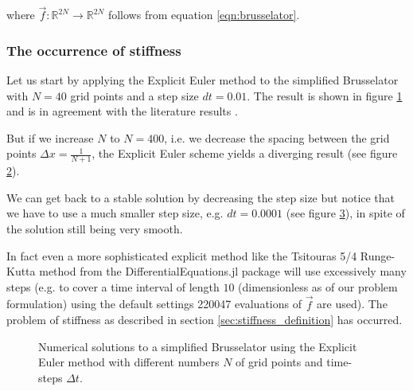 where $\vec{f}: \mathbb{R}^{2N} \rightarrow \mathbb{R}^{2N}$ follows from equation \ref*{eqn:brusselator}.

\subsubsection*{The occurrence of stiffness}
Let us start by applying the Explicit Euler method to the simplified Brusselator with $N = 40$ grid points and a step size $dt = 0.01$. The result is shown in figure \ref{fig:bruss_ex_eu40} and is in agreement with the literature results \citep[chapter IV.1]{Hairer1996}.

But if we increase $N$ to $N = 400$, i.e. we decrease the spacing between the grid points $\Delta x = \frac{1}{N+1}$, the Explicit Euler scheme yields a diverging result (see figure \ref{fig:bruss_ex_eu400A}).

We can get back to a stable solution by decreasing the step size but notice that we have to use a much smaller step size, e.g. $dt = 0.0001$ (see figure \ref{fig:bruss_ex_eu400B}), in spite of the solution still being very smooth.

In fact even a more sophisticated explicit method like the Tsitouras 5/4 Runge-Kutta method from the DifferentialEquations.jl package \citep{rackauckas17} will use excessively many steps (e.g. to cover a time interval of length $10$ (dimensionless as of our problem formulation) using the default settings 220047 evaluations of $\vec{f}$ are used). The problem of stiffness as described in section \ref*{sec:stiffness_definition} has occurred.

\begin{figure}
  \centering
  \begin{subfigure}{.5\textwidth}
    \centering
    
    \caption[width=.92\linewidth]{}
    \label{fig:bruss_ex_eu40}
  \end{subfigure}%
  \begin{subfigure}{.5\textwidth}
    \centering
    
    \caption[width=.92\linewidth]{}
    \label{fig:bruss_ex_eu400A}
  \end{subfigure}
  \begin{subfigure}{.5\textwidth}
    \centering
    
    \caption[width=.92\linewidth]{}
    \label{fig:bruss_ex_eu400B}
  \end{subfigure}
  \caption{Numerical solutions to a simplified Brusselator using the Explicit Euler method with different numbers $N$ of grid points and time-steps $\Delta t$.}
  \label{fig:bruss_2d_stab}
\end{figure}

